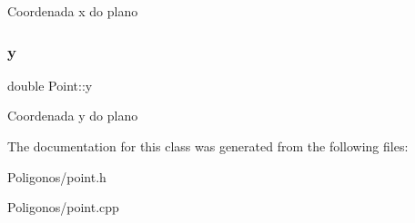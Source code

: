 Coordenada x do plano \mbox{\label{class_point_afa38be143ae800e6ad69ce8ed4df62d8}} 
\subsubsection{\texorpdfstring{y}{y}}
{\footnotesize\ttfamily double Point\+::y\hspace{0.3cm}{\ttfamily [protected]}}

Coordenada y do plano 

The documentation for this class was generated from the following files\+:\begin{DoxyCompactItemize}
\item 
Poligonos/point.\+h\item 
Poligonos/point.\+cpp\end{DoxyCompactItemize}
